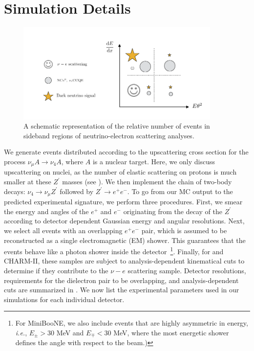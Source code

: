 \section{Simulation Details}
%
\begin{figure}[t]
 \includegraphics[width = 0.9\textwidth]{MiniBooNE_tests.pdf}
 \caption[Diagram of the sidebands in neutrino-electron scattering analyses.]{A schematic representation of the relative number of events in sideband regions of neutrino-electron scattering analyses.}
\end{figure}
%
We generate events distributed according to the upscattering cross section for the process $\nu_\mu A \to \nu_4 A$, where $A$ is a nuclear target. Here, we only discuss upscattering on nuclei, as the number of elastic scattering on protons is much smaller at these $Z^\prime$ masses (see ). We then implement the chain of two-body decays: $\nu_4 \to \nu_\mu Z^\prime$ followed by $Z^\prime \to e^+ e^-$. To go from our MC output to the predicted experimental signature, we perform three procedures. First, we smear the energy and angles of the $e^+$ and $e^-$ originating from the decay of the $Z^\prime$ according to detector dependent Gaussian energy and angular resolutions. Next, we select all events with an overlapping $e^+e^-$ pair, which is assumed to be reconstructed as a single electromagnetic (EM) shower. This guarantees that the events behave like a photon shower inside the detector~\footnote{For MiniBooNE, we also include events that are highly asymmetric in energy, \textit{i.e.}, $E_{\pm} > 30$ MeV and $E_{\mp} < 30$ MeV, where the most energetic shower defines the angle with respect to the beam.)}. Finally, for \minerva and CHARM-II, these samples are subject to analysis-dependent kinematical cuts to determine if they contribute to the $\nu-e$ scattering sample. Detector resolutions, requirements for the dielectron pair to be overlapping, and analysis-dependent cuts are summarized in . We now list the experimental parameters used in our simulations for each individual detector. 


